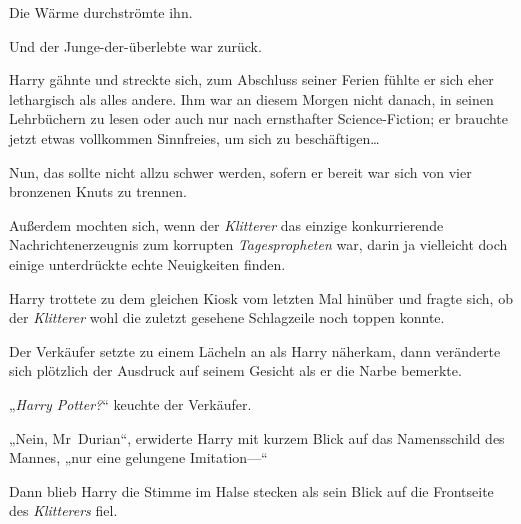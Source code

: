 Die Wärme durchströmte ihn.

Und der Junge-der-überlebte war zurück.

Harry gähnte und streckte sich, zum Abschluss seiner Ferien fühlte er sich eher lethargisch als alles andere. Ihm war an diesem Morgen nicht danach, in seinen Lehrbüchern zu lesen oder auch nur nach ernsthafter Science-Fiction; er brauchte jetzt etwas vollkommen Sinnfreies, um sich zu beschäftigen…

Nun, das sollte nicht allzu schwer werden, sofern er bereit war sich von vier bronzenen Knuts zu trennen.

Außerdem mochten sich, wenn der \emph{Klitterer} das einzige konkurrierende Nachrichtenerzeugnis zum korrupten \emph{Tagespropheten} war, darin ja vielleicht doch einige unterdrückte echte Neuigkeiten finden.

Harry trottete zu dem gleichen Kiosk vom letzten Mal hinüber und fragte sich, ob der \emph{Klitterer} wohl die zuletzt gesehene Schlagzeile noch toppen konnte.

Der Verkäufer setzte zu einem Lächeln an als Harry näherkam, dann veränderte sich plötzlich der Ausdruck auf seinem Gesicht als er die Narbe bemerkte.

„\emph{Harry Potter?}“ keuchte der Verkäufer.

„Nein, Mr~Durian“, erwiderte Harry mit kurzem Blick auf das Namensschild des Mannes, „nur eine gelungene Imitation—“

Dann blieb Harry die Stimme im Halse stecken als sein Blick auf die Frontseite des \emph{Klitterers} fiel.

